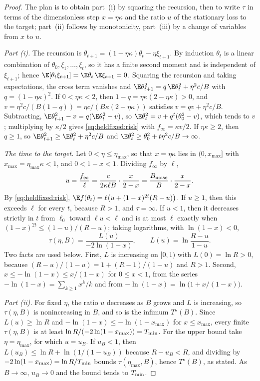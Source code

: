 \begin{refsection}
\begin{proof}
The plan is to obtain part~(i) by squaring the recursion, then to write $\tau$ in terms of the dimensionless step $x=\eta\kappa$ and the ratio $u$ of the stationary loss to the target; part~(ii) follows by monotonicity, part~(iii) by a change of variables from $x$ to $u$.

\emph{Part (i).} The recursion is $\theta_{t+1}=(1-\eta\kappa)\theta_t-\eta\xi_{t+1}$. By induction $\theta_t$ is a linear combination of $\theta_0,\xi_1,\dots,\xi_t$, so it has a finite second moment and is independent of $\xi_{t+1}$; hence $\E[\theta_t\xi_{t+1}]=\E\theta_t\,\E\xi_{t+1}=0$. Squaring the recursion and taking expectations, the cross term vanishes and $\E\theta_{t+1}^2=q\,\E\theta_t^2+\eta^2c/B$ with $q=(1-\eta\kappa)^2$. If $0<\eta\kappa<2$, then $1-q=\eta\kappa(2-\eta\kappa)>0$, and $v=\eta^2c/(B(1-q))=\eta c/(B\kappa(2-\eta\kappa))$ satisfies $v=qv+\eta^2c/B$. Subtracting, $\E\theta_{t+1}^2-v=q(\E\theta_t^2-v)$, so $\E\theta_t^2=v+q^t(\theta_0^2-v)$, which tends to $v$; multiplying by $\kappa/2$ gives \eqref{eq:heldfixed:risk} with $f_\infty=\kappa v/2$. If $\eta\kappa\ge2$, then $q\ge1$, so $\E\theta_{t+1}^2\ge\E\theta_t^2+\eta^2c/B$ and $\E\theta_t^2\ge\theta_0^2+t\eta^2c/B\to\infty$.

\emph{The time to the target.} Let $0<\eta\le\eta_{\max}$, so that $x=\eta\kappa$ lies in $(0,x_{\max}]$ with $x_{\max}=\eta_{\max}\kappa<1$, and $0<1-x<1$. Dividing $f_\infty$ by $\ell$,
\[
u=\frac{f_\infty}{\ell}=\frac{c}{2\kappa\ell B}\cdot\frac{x}{2-x}=\frac{B_{\mathrm{noise}}}{B}\cdot\frac{x}{2-x}.
\]
By \eqref{eq:heldfixed:risk}, $\E f(\theta_t)=\ell\bigl(u+(1-x)^{2t}(R-u)\bigr)$. If $u\ge1$, then this exceeds $\ell$ for every $t$, because $R>1$, and $\tau=\infty$. If $u<1$, then it decreases strictly in $t$ from $\ell_0$ toward $\ell u<\ell$ and is at most $\ell$ exactly when $(1-x)^{2t}\le(1-u)/(R-u)$; taking logarithms, with $\ln(1-x)<0$,
\begin{equation}\label{eq:heldfixed:tau}
\tau(\eta,B)=\frac{L(u)}{-2\ln(1-x)},\qquad L(u)=\ln\frac{R-u}{1-u}.
\end{equation}
Two facts are used below. First, $L$ is increasing on $[0,1)$ with $L(0)=\ln R>0$, because $(R-u)/(1-u)=1+(R-1)/(1-u)$ and $R>1$. Second, $x\le-\ln(1-x)\le x/(1-x)$ for $0\le x<1$, from the series $-\ln(1-x)=\sum_{k\ge1}x^k/k$ and from $-\ln(1-x)=\ln\bigl(1+x/(1-x)\bigr)$.

\emph{Part (ii).} For fixed $\eta$, the ratio $u$ decreases as $B$ grows and $L$ is increasing, so $\tau(\eta,B)$ is nonincreasing in $B$, and so is the infimum $T^\star(B)$. Since $L(u)\ge\ln R$ and $-\ln(1-x)\le-\ln(1-x_{\max})$ for $x\le x_{\max}$, every finite $\tau(\eta,B)$ is at least $\ln R/(-2\ln(1-x_{\max}))=T_{\min}$. For the upper bound take $\eta=\eta_{\max}$, for which $u=u_B$. If $u_B<1$, then $L(u_B)\le\ln R+\ln(1/(1-u_B))$ because $R-u_B<R$, and dividing by $-2\ln(1-x_{\max})=\ln R/T_{\min}$ bounds $\tau(\eta_{\max},B)$, hence $T^\star(B)$, as stated. As $B\to\infty$, $u_B\to0$ and the bound tends to $T_{\min}$.


\end{proof}
\end{refsection}
